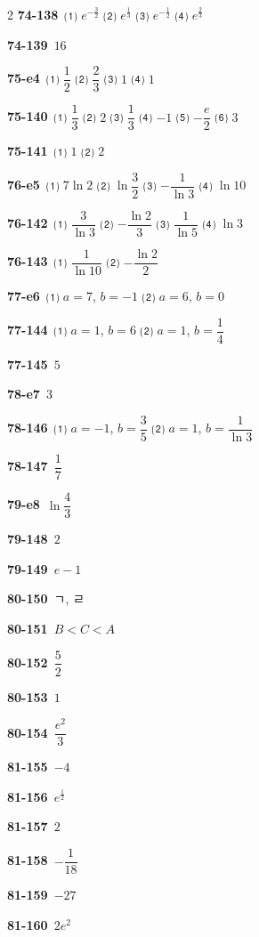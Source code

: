 \documentclass[10pt,a4paper]{article}
\begin{document}
\begin{multicols}{2}
\noindent\textbf{74-138}\ ⑴ $e^{-\frac{3}{2}}$ ⑵ $e^{\frac{1}{3}}$ ⑶ $e^{-\frac{1}{2}}$ ⑷ $e^{\frac{2}{3}}$\par
\noindent\textbf{74-139}\ $16$\par
\noindent\textbf{75-e4}\ ⑴ $\dfrac{1}{2}$ ⑵ $\dfrac{2}{3}$ ⑶ $1$ ⑷ $1$\par
\noindent\textbf{75-140}\ ⑴ $\dfrac{1}{3}$ ⑵ $2$ ⑶ $\dfrac{1}{3}$ ⑷ $-1$ ⑸ $-\dfrac{e}{2}$ ⑹ $3$\par
\noindent\textbf{75-141}\ ⑴ $1$ ⑵ $2$\par
\noindent\textbf{76-e5}\ ⑴ $7\ln 2$ ⑵ $\ln\dfrac{3}{2}$ ⑶ $-\dfrac{1}{\ln 3}$ ⑷ $\ln 10$\par
\noindent\textbf{76-142}\ ⑴ $\dfrac{3}{\ln 3}$ ⑵ $-\dfrac{\ln 2}{3}$ ⑶ $\dfrac{1}{\ln 5}$ ⑷ $\ln 3$\par
\noindent\textbf{76-143}\ ⑴ $\dfrac{1}{\ln 10}$ ⑵ $-\dfrac{\ln 2}{2}$\par
\noindent\textbf{77-e6}\ ⑴ $a=7$, $b=-1$ ⑵ $a=6$, $b=0$\par
\noindent\textbf{77-144}\ ⑴ $a=1$, $b=6$ ⑵ $a=1$, $b=\dfrac{1}{4}$\par
\noindent\textbf{77-145}\ $5$\par
\noindent\textbf{78-e7}\ $3$\par
\noindent\textbf{78-146}\ ⑴ $a=-1$, $b=\dfrac{3}{5}$ ⑵ $a=1$, $b=\dfrac{1}{\ln 3}$\par
\noindent\textbf{78-147}\ $\dfrac{1}{7}$\par
\noindent\textbf{79-e8}\ $\ln\dfrac{4}{3}$\par
\noindent\textbf{79-148}\ $2$\par
\noindent\textbf{79-149}\ $e-1$\par
\noindent\textbf{80-150}\ ㄱ, ㄹ\par
\noindent\textbf{80-151}\ $B<C<A$\par
\noindent\textbf{80-152}\ $\dfrac{5}{2}$\par
\noindent\textbf{80-153}\ $1$\par
\noindent\textbf{80-154}\ $\dfrac{e^2}{3}$\par
\noindent\textbf{81-155}\ $-4$\par
\noindent\textbf{81-156}\ $e^{\frac{1}{2}}$\par
\noindent\textbf{81-157}\ $2$\par
\noindent\textbf{81-158}\ $-\dfrac{1}{18}$\par
\noindent\textbf{81-159}\ $-27$\par
\noindent\textbf{81-160}\ $2e^2$\par

\end{multicols}
\end{document}
